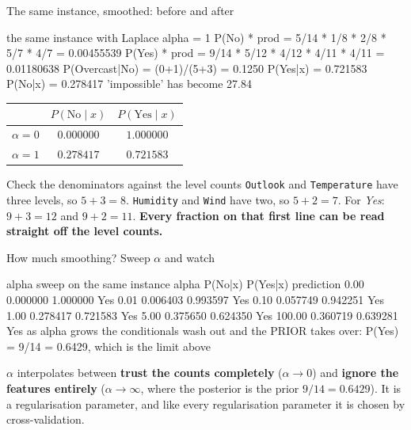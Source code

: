 \documentclass[aspectratio=169]{beamer}
\begin{document}
\begin{frame}[fragile,shrink=7]{The same instance, smoothed: before and after}
\begin{outblk}
the same instance with Laplace alpha = 1
      P(No) * prod = 5/14 * 1/8 * 2/8 * 5/7 * 4/7 = 0.00455539
      P(Yes) * prod = 9/14 * 5/12 * 4/12 * 4/11 * 4/11 = 0.01180638
      P(Overcast|No) = (0+1)/(5+3) = 0.1250
      P(Yes|x) = 0.721583   P(No|x) = 0.278417
      'impossible' has become 27.84%
\end{outblk}
\begin{center}\small
\begin{tabular}{@{}lcc@{}}
  \toprule
   & $P(\text{No} \mid x)$ & $P(\text{Yes} \mid x)$\\
  \midrule
  $\alpha = 0$ & $\mathbf{0.000000}$ & $1.000000$\\
  $\alpha = 1$ & $\mathbf{0.278417}$ & $0.721583$\\
  \bottomrule
\end{tabular}
\end{center}
\begin{alertblock}{Check the denominators against the level counts}
  \footnotesize \texttt{Outlook} and \texttt{Temperature} have three levels,
  so $5+3 = 8$. \texttt{Humidity} and \texttt{Wind} have two, so $5+2 = 7$.
  For \emph{Yes}: $9+3 = 12$ and $9+2 = 11$. \textbf{Every fraction on that
  first line can be read straight off the level counts.}
\end{alertblock}
\end{frame}

\begin{frame}[fragile,shrink=8]{How much smoothing? Sweep $\alpha$ and watch}
\begin{outblk}
alpha sweep on the same instance
      alpha    P(No|x)   P(Yes|x)  prediction
       0.00   0.000000   1.000000  Yes
       0.01   0.006403   0.993597  Yes
       0.10   0.057749   0.942251  Yes
       1.00   0.278417   0.721583  Yes
       5.00   0.375650   0.624350  Yes
     100.00   0.360719   0.639281  Yes
   as alpha grows the conditionals wash out and the PRIOR takes over:
   P(Yes) = 9/14 = 0.6429, which is the limit above
\end{outblk}
\begin{center}\small
  $\alpha$ interpolates between \textbf{trust the counts completely}
  ($\alpha \to 0$) and \textbf{ignore the features entirely}
  ($\alpha \to \infty$, where the posterior is the prior $9/14 = 0.6429$).
  It is a regularisation parameter, and like every regularisation parameter
  it is chosen by cross-validation.
\end{center}
\end{frame}
\end{document}
